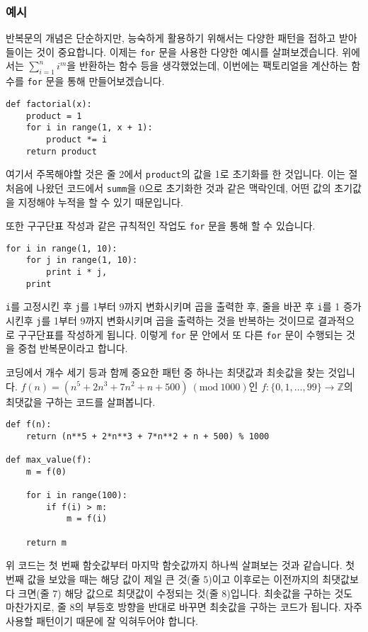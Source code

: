 \documentclass[../main.tex]{subfiles}
\begin{document}
\subsubsection{예시}
반복문의 개념은 단순하지만, 능숙하게 활용하기 위해서는 다양한 패턴을 접하고 받아들이는 것이 중요합니다.
이제는 \texttt{for} 문을 사용한 다양한 예시를 살펴보겠습니다.
위에서는 $\sum_{i = 1}^n i^m$을 반환하는 함수 등을 생각했었는데, 이번에는 팩토리얼을 계산하는 함수를 \texttt{for} 문을 통해 만들어보겠습니다.
\begin{verbatim}
def factorial(x):
	product = 1
	for i in range(1, x + 1):
		product *= i
	return product
\end{verbatim}
여기서 주목해야할 것은 줄 2에서 \texttt{product}의 값을 1로 초기화를 한 것입니다.
이는 절 처음에 나왔던 코드에서 \texttt{summ}을 0으로 초기화한 것과 같은 맥락인데, 어떤 값의 초기값을 지정해야 누적을 할 수 있기 때문입니다.

또한 구구단표 작성과 같은 규칙적인 작업도 \texttt{for} 문을 통해 할 수 있습니다.
\begin{verbatim}
for i in range(1, 10):
	for j in range(1, 10):
		print i * j,
	print
\end{verbatim}
\texttt{i}를 고정시킨 후 \texttt{j}를 1부터 9까지 변화시키며 곱을 출력한 후, 줄을 바꾼 후 \texttt{i}를 1 증가시킨후 \texttt{j}를 1부터 9까지 변화시키며 곱을 출력하는 것을 반복하는 것이므로 결과적으로 구구단표를 작성하게 됩니다.
이렇게 \texttt{for} 문 안에서 또 다른 \texttt{for} 문이 수행되는 것을 중첩 반복문이라고 합니다.

코딩에서 개수 세기 등과 함께 중요한 패턴 중 하나는 최댓값과 최솟값을 찾는 것입니다.
$f(n) = (n^5 + 2n^3 + 7n^2 + n + 500)\ (\text{mod}\ 1000)$인 $f: \{0, 1, \dots, 99\} \rightarrow \mathbb{Z}$의 최댓값을 구하는 코드를 살펴봅니다.\
\begin{verbatim}
def f(n):
	return (n**5 + 2*n**3 + 7*n**2 + n + 500) % 1000

def max_value(f):
	m = f(0)
	
	for i in range(100):
		if f(i) > m:
			m = f(i)

	return m
\end{verbatim}
위 코드는 첫 번째 함숫값부터 마지막 함숫값까지 하나씩 살펴보는 것과 같습니다.
첫 번째 값을 보았을 때는 해당 값이 제일 큰 것(줄 5)이고 이후로는 이전까지의 최댓값보다 크면(줄 7) 해당 값으로 최댓값이 수정되는 것(줄 8)입니다.
최솟값을 구하는 것도 마찬가지로, 줄 8의 부등호 방향을 반대로 바꾸면 최솟값을 구하는 코드가 됩니다.
자주 사용할 패턴이기 때문에 잘 익혀두어야 합니다.
\end{document}
